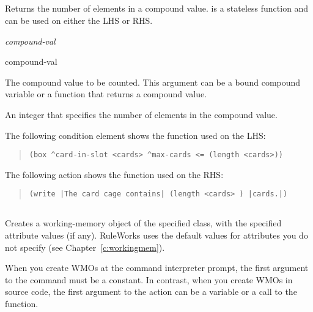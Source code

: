 \subsection{}

Returns the number of elements in a compound value.  is a
stateless function and can be used on either the LHS or RHS.

\Format

 \it{compound-val}

\begin{argument}
\item[compound-val]

  The compound value to be counted. This argument can be a bound
  compound variable or a function that returns a compound value.
\end{argument}

\ReturnValue

An integer that specifies the number of elements in the
compound value.

\Example

The following condition element shows the  function used on
the LHS:

\begin{quote}
\begin{verbatim}
(box ^card-in-slot <cards> ^max-cards <= (length <cards>))
\end{verbatim}
\end{quote}

The following action shows the  function used on the RHS:

\begin{quote}
\begin{verbatim}
(write |The card cage contains| (length <cards> ) |cards.|)
\end{verbatim}
\end{quote}

\subsection{}

Creates a working-memory object of the specified class, with the
specified attribute values (if any). RuleWorks uses the default values
for attributes you do not specify (see Chapter~\ref{c:workingmem}).

\begin{note}
  When you create WMOs at the command interpreter prompt, the first
  argument to the  command must be a constant. In contrast,
  when you create WMOs in source code, the first argument to the
   action can be a variable or a call to the 
  function.
\end{note}

